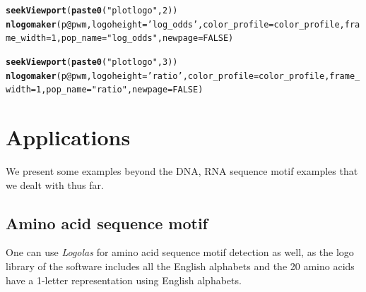 \documentclass[12pt]{article}\usepackage[]{graphicx}\usepackage[usenames,dvipsnames]{color}
\makeatletter
\newcommand{\hlnum}[1]{\textcolor[rgb]{0.686,0.059,0.569}{#1}}%
\newcommand{\hlstr}[1]{\textcolor[rgb]{0.192,0.494,0.8}{#1}}%
\newcommand{\hlopt}[1]{\textcolor[rgb]{0,0,0}{#1}}%
\newcommand{\hlstd}[1]{\textcolor[rgb]{0.345,0.345,0.345}{#1}}%
\newcommand{\hlkwc}[1]{\textcolor[rgb]{0.333,0.667,0.333}{#1}}%
\newcommand{\hlkwd}[1]{\textcolor[rgb]{0.737,0.353,0.396}{\textbf{#1}}}%
\newenvironment{kframe}{%
 \def\at@end@of@kframe{}%
 \ifinner\ifhmode%
  \def\at@end@of@kframe{\end{minipage}}%
  \begin{minipage}{\columnwidth}%
 \fi\fi%
 \def\FrameCommand##1{\hskip\@totalleftmargin \hskip-\fboxsep
 \colorbox{shadecolor}{##1}\hskip-\fboxsep
     \hskip-\linewidth \hskip-\@totalleftmargin \hskip\columnwidth}%
 \MakeFramed {\advance\hsize-\width
   \@totalleftmargin\z@ \linewidth\hsize
   \@setminipage}}%
 {\par\unskip\endMakeFramed%
 \at@end@of@kframe}
\newenvironment{knitrout}{}{} %
\newcommand{\Logolas}{\textit{Logolas}}
\makeatother
\begin{document}
\begin{knitrout}
\begin{kframe}
\begin{alltt}
\hlkwd{seekViewport}\hlstd{(}\hlkwd{paste0}\hlstd{(}\hlstr{"plotlogo"}\hlstd{,} \hlnum{2}\hlstd{))}
\hlkwd{nlogomaker}\hlstd{(p}\hlopt{@}\hlkwc{pwm}\hlstd{,}\hlkwc{logoheight} \hlstd{=} \hlstr{'log_odds'}\hlstd{,}\hlkwc{color_profile} \hlstd{= color_profile,}\hlkwc{frame_width} \hlstd{=} \hlnum{1}\hlstd{,} \hlkwc{pop_name} \hlstd{=} \hlstr{"log_odds"}\hlstd{,} \hlkwc{newpage} \hlstd{=} \hlnum{FALSE}\hlstd{)}

\hlkwd{seekViewport}\hlstd{(}\hlkwd{paste0}\hlstd{(}\hlstr{"plotlogo"}\hlstd{,} \hlnum{3}\hlstd{))}
\hlkwd{nlogomaker}\hlstd{(p}\hlopt{@}\hlkwc{pwm}\hlstd{,}\hlkwc{logoheight} \hlstd{=} \hlstr{'ratio'}\hlstd{,}\hlkwc{color_profile} \hlstd{= color_profile,}\hlkwc{frame_width} \hlstd{=} \hlnum{1}\hlstd{,} \hlkwc{pop_name} \hlstd{=} \hlstr{"ratio"}\hlstd{,} \hlkwc{newpage} \hlstd{=} \hlnum{FALSE}\hlstd{)}
\end{alltt}
\end{kframe}
\end{knitrout}



\section{Applications}

We present some examples beyond the DNA, RNA sequence motif examples that we dealt with thus far.

\subsection{Amino acid sequence motif}

One can use \Logolas{} for amino acid sequence motif detection as well, as the logo library of the software includes all the English alphabets and the 20 amino acids have a 1-letter representation using English alphabets.
\end{document}

